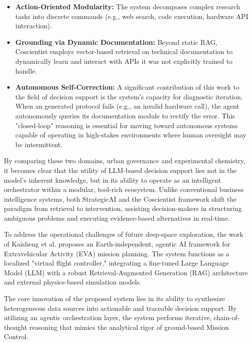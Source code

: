 \begin{itemize}
\item \textbf{Action-Oriented Modularity:} The system decomposes complex research tasks into discrete commands (e.g., web search, code execution, hardware API interaction). 

\item \textbf{Grounding via Dynamic Documentation:} Beyond static RAG, Coscientist employs vector-based retrieval on technical documentation to dynamically learn and interact with APIs it was not explicitly trained to handle. 
\item \textbf{Autonomous Self-Correction:} A significant contribution of this work to the field of decision support is the system's capacity for diagnostic iteration. When an generated protocol fails (e.g., an invalid hardware call), the agent autonomously queries its documentation module to rectify the error. This "closed-loop" reasoning is essential for moving toward autonomous systems capable of operating in high-stakes environments where human oversight may be intermittent.
\end{itemize}

By comparing these two domains, urban governance and experimental chemistry, it becomes clear that the utility of LLM-based decision support lies not in the model's inherent knowledge, but in its ability to operate as an intelligent orchestrator within a modular, tool-rich ecosystem. Unlike conventional business intelligence systems, both StrategicAI and the Coscientist framework shift the paradigm from retrieval to intervention, assisting decision-makers in structuring ambiguous problems and executing evidence-based alternatives in real-time.



To address the operational challenges of future deep-space exploration, the work of Kaisheng  et al. \cite{li_et_al:OASIcs.SpaceCHI.2025.6} proposes an Earth-independent, agentic AI framework for Extravehicular Activity (EVA) mission planning. The system functions as a localized "virtual flight controller," integrating a fine-tuned Large Language Model (LLM) with a robust Retrieval-Augmented Generation (RAG) architecture and external physics-based simulation models. 

The core innovation of the proposed system lies in its ability to synthesize heterogeneous data sources into actionable and traceable decision support. By utilizing an agentic orchestration layer, the system performs iterative, chain-of-thought reasoning that mimics the analytical rigor of ground-based Mission Control. 

